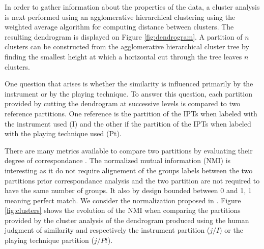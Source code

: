 \documentclass{article}
\newcommand{\ipts}{IPTs\xspace}
\begin{document}
In order to gather information about the properties of the data, a cluster analysis is next performed using an agglomerative hierarchical clustering \cite{gordon1987review} using the weighted average algorithm for computing distance between clusters. The resulting dendrogram is displayed on Figure \ref{fig:dendrogram}. A partition of $n$ clusters can be constructed from the agglomerative hierarchical cluster tree by finding the smallest height at which a horizontal cut through the tree leaves $n$ clusters.

One question that arises is whether the similarity is influenced primarily by the instrument or by the playing technique. To answer this question, each partition provided by cutting the dendrogram at successive levels is compared to two reference partitions. One reference is the partition of the \ipts when labeled with the instrument used (I) and the other if the partition of the \ipts when labeled with the playing technique used (Pt).

There are many metrics available to compare two partitions by evaluating their degree of correspondance \cite{wagner2007comparing}. The normalized mutual information (NMI) is interesting as it do not require alignement of the groups labels between the two partitions prior correspondance analysis and the two partition are not required to have the same number of groups. It also by design bounded between 0 and 1, 1 meaning perfect match. We consider the normalization proposed in \cite{strehl2002cluster}. Figure \ref{fig:clusters} shows the evolution of the NMI when comparing the partitions provided by the cluster analysis of the dendrogram produced using the human judgment of similarity and respectively the instrument partition ($j/I$) or the playing technique partition ($j/Pt$).
\end{document}
